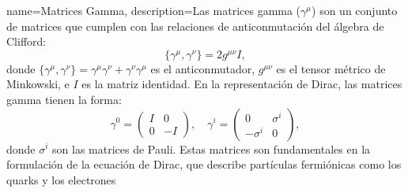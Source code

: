 {
    name=Matrices Gamma,
    description={Las matrices gamma (\( \gamma^\mu \)) son un conjunto de matrices que cumplen con las relaciones de anticonmutación del álgebra de Clifford:
    \[
        \{ \gamma^\mu, \gamma^\nu \} = 2 g^{\mu \nu} I,
    \]
    donde \( \{ \gamma^\mu, \gamma^\nu \} = \gamma^\mu \gamma^\nu + \gamma^\nu \gamma^\mu \) es el anticonmutador, \( g^{\mu \nu} \) es el tensor métrico de Minkowski, e \( I \) es la matriz identidad. En la representación de Dirac, las matrices gamma tienen la forma:
    \[
        \gamma^0 = \begin{pmatrix}
            I & 0 \\
            0 & -I
        \end{pmatrix}, \quad
        \gamma^i = \begin{pmatrix}
            0 & \sigma^i \\
            -\sigma^i & 0
        \end{pmatrix},
    \]
    donde \( \sigma^i \) son las matrices de Pauli. Estas matrices son fundamentales en la formulación de la ecuación de Dirac, que describe partículas fermiónicas como los quarks y los electrones}
}